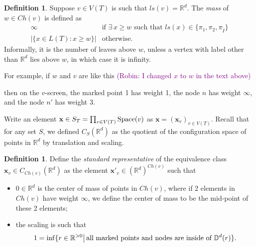 \documentclass[11pt]{article}
\theoremstyle{definition}
\newtheorem{dfn}[thm]{Definition}
\theoremstyle{remark}
\def\R{\mathbb{R}}
\def\D{\mathbb{D}}
\def\rI{{\mathring{I}}}
\def\Ch{{{Ch}}}
\def\bx{\mathbf{x}}
\def\cmt#1{\textcolor{purple}{(#1)}}
\def\tn#1{\textnormal{#1}}
\begin{document}
\begin{dfn}
Suppose $v\in V(T)$ is such that $ls(v)=\R^d$. 
The {\it mass} of $w\in \Ch(v)$ is defined as 
\[
\begin{array}{ll}
\infty & \text{if } \exists\, x\geq w \text{ such that } ls(x) \in \{\pi_1, \pi_2, \pi_\rI\} \\
|\{ x \in L(T): x \geq w\} | & \text{otherwise.}
\end{array}
\]
Informally, it is the number of leaves above $w$, unless a vertex with label other than $\R^d$ lies above $w$, in which case it is infinity.
\end{dfn}

For example, if $w$ and $v$ are like this 
\cmt{Robin: I changed $x$ to $w$ in the text above}


then on the $v$-screen, the marked point 1 has weight 1, the node $n$ has weight $\infty$, and the node $n'$ has weight 3.


Write an element $\bx \in S_T=\prod_{v\in V(T)}\tn{Space}(v)$ as $\bx=(\bx_v)_{v\in V(T)}$.
Recall that for any set $S$, we defined $C_S(\R^d)$ as the quotient of the configuration space of points in $\R^d$ by translation and scaling.

\begin{dfn}\label{screennormalize_dfn}
Define the {\it standard representative} of 
 the equivalence class $\bx_v\in C_{\Ch(v)}(\R^d)$
as the element $\bx'_v\in (\R^d)^{\Ch(v)}$ such that 
\begin{itemize}
\item $0\in\R^d$ is the center of mass of points in $\Ch(v)$, where if 2 elements in $\Ch(v)$ have weight $\infty$, we define the center of mass to be the mid-point of these 2 elements; 

\item the scaling is such that 
$$1=\inf\{r\in\R^{>0}\big|\,\tn{all marked points and nodes are inside of }\D^d(r)\}.$$
\end{itemize}
\end{dfn}
\end{document}
